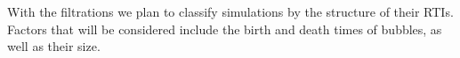 \documentclass[12pt, fullpage,letterpaper]{article}
\begin{document}
	With the filtrations we plan to classify simulations by the structure of their RTIs. Factors that will be considered include the birth and death times of bubbles, as well as their size.
%  
%	
%
%	
%	
\end{document}
